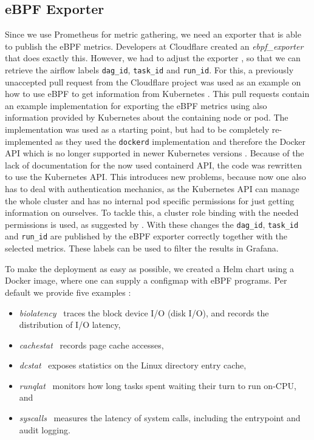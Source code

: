 \documentclass[a4paper,journal]{IEEEtran}
\begin{document}
\subsection{eBPF Exporter}
Since we use Prometheus for metric gathering, we need an exporter that is able to publish the eBPF metrics. Developers at Cloudflare created an \textit{ebpf\_exporter} \cite{ebpfCloudflare} that does exactly this. However, we had to adjust the exporter \cite{ebpfExporterJulian}, so that we can retrieve the airflow labels \texttt{dag\_id}, \texttt{task\_id} and \texttt{run\_id}. For this, a previously unaccepted pull request from the Cloudflare project was used as an example on how to use eBPF to get information from Kubernetes \cite{ebpfPull75}. This pull requests contain an example implementation for exporting the eBPF metrics using also information provided by Kubernetes about the containing node or pod. The implementation was used as a starting point, but had to be completely re-implemented as they used the \texttt{dockerd} implementation and therefore the Docker API which is no longer supported in newer Kubernetes versions \cite{kubernetesDockerDepricated}. Because of the lack of documentation for the now used containerd API, the code was rewritten to use the Kubernetes API. This introduces new problems, because now one also has to deal with authentication mechanics, as the Kubernetes API can manage the whole cluster and has no internal pod specific permissions for just getting information on ourselves. To tackle this, a cluster role binding with the needed permissions is used, as suggested by \cite{kubernetesRbac}. With these changes the \texttt{dag\_id}, \texttt{task\_id} and \texttt{run\_id} are published by the eBPF exporter correctly together with the selected metrics. These labels can be used to filter the results in Grafana.

To make the deployment as easy as possible, we created a Helm chart using a Docker image, where one can supply a configmap with eBPF programs. Per default we provide five examples \cite{ebpfexporterexamples}:
\begin{itemize}
    \item \textit{biolatency}~ traces the block device I/O (disk I/O), and records the distribution of I/O latency,
    \item \textit{cachestat}~ records page cache accesses,
    \item \textit{dcstat}~ exposes statistics on the Linux  directory  entry cache,
    \item \textit{runqlat}~ monitors how long tasks spent waiting their turn to run on-CPU, and
    \item \textit{syscalls}~ measures the latency of system calls, including the entrypoint and audit logging.
\end{itemize}
\end{document}
